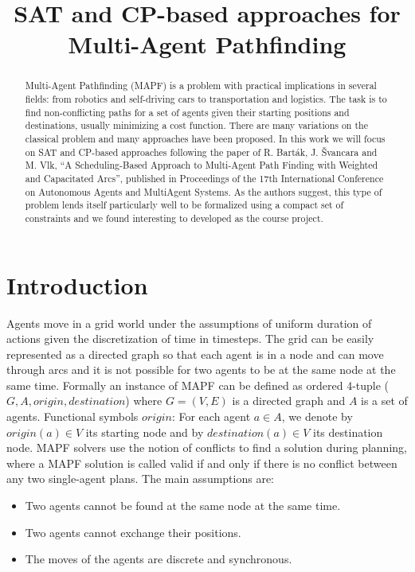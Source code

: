 \documentclass[12pt, a4paper, hidelinks]{article}
\numberwithin{equation}{section}
\begin{document}
\title{SAT and CP-based approaches for Multi-Agent Pathfinding}
\maketitle

\begin{abstract}
Multi-Agent Pathfinding (MAPF) is a problem with practical implications in several fields: from robotics and self-driving cars to transportation and logistics.
The task is to find non-conflicting paths for a set of agents given their starting positions and destinations, usually minimizing a cost function.
There are many variations on the classical problem and many approaches have been proposed.
In this work we will focus on SAT and CP-based approaches following the paper of R. Barták, J. Švancara and M. Vlk, ``A Scheduling-Based Approach to Multi-Agent Path Finding with Weighted and Capacitated Arcs'', published in Proceedings of the 17th International Conference on Autonomous Agents and MultiAgent Systems.
As the authors suggest, this type of problem lends itself particularly well to be formalized using a compact set of constraints and we found interesting to developed as the course project.
\end{abstract}

\section*{Introduction}\label{sec:introduction}
Agents move in a grid world under the assumptions of uniform duration of actions given the discretization of time in timesteps.
The grid can be easily represented as a directed graph so that each agent is in a node and can move through arcs and it is not possible for two agents to be at the same node at the same time.
Formally an instance of MAPF can be defined as ordered 4-tuple ($G, A, origin, destination$) where $G = (V, E)$ is a directed graph and $A$ is a set of agents.
Functional symbols $origin$: %
For each agent $a\in A$, we denote by $origin(a)\in V$ its starting node and by $destination(a)\in V$ its destination node.
MAPF solvers use the notion of conflicts to find a solution during planning, where a MAPF solution is called valid if and only if there is no conflict between any two single-agent plans.
The main assumptions are:

\begin{itemize} 
\item Two agents cannot be found at the same node at the same time.
\item Two agents cannot exchange their positions.
\item The moves of the agents are discrete and synchronous.
\end{itemize}
\end{document}
